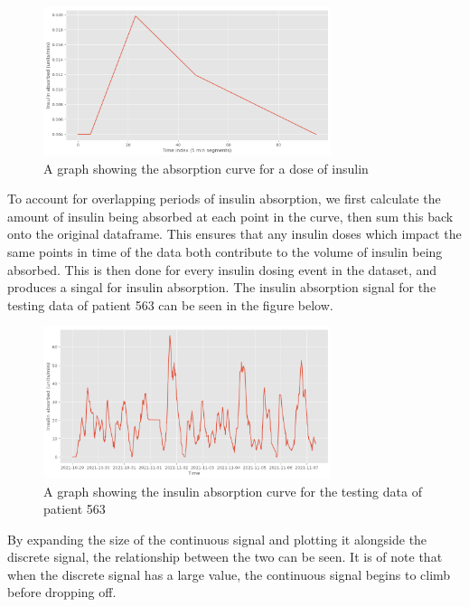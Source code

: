           \begin{figure}[H]
            \centering
            \includegraphics[width=0.75\textwidth]{images/InsulinSM.png} 
            \caption{
             A graph showing the absorption curve for a dose of insulin
            }
          \end{figure}
          
          To account for overlapping periods of insulin absorption, we first calculate the amount of insulin being absorbed at each point in the curve, then sum this back onto the original dataframe. This ensures that any insulin doses which impact the same points in time of the data both contribute to the volume of insulin being absorbed. This is then done for every insulin dosing event in the dataset, and produces a singal for insulin absorption. The insulin absorption signal for the testing data of patient 563 can be seen in the figure below.

          \begin{figure}[H]
            \centering
            \includegraphics[width=0.75\textwidth]{images/InsulinLG.png} 
            \caption{
             A graph showing the insulin absorption curve for the testing data of patient 563
            }
          \end{figure}

          By expanding the size of the continuous signal and plotting it alongside the discrete signal, the relationship between the two can be seen. It is of note that when the discrete signal has a large value, the continuous signal begins to climb before dropping off.

